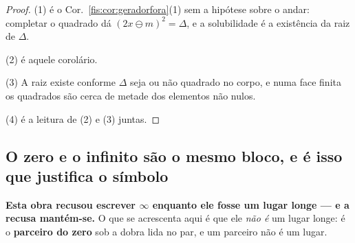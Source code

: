 \documentclass[livro.tex]{subfiles}
\begin{document}
\begin{proof}
(1) é o Cor.~\ref{fis:cor:geradorfora}(1) sem a hipótese sobre o andar: completar
o quadrado dá $(2x\ominus m)^{2}=\Delta$, e a solubilidade é a existência da raiz
de $\Delta$.

(2) é aquele corolário.

(3) A raiz existe conforme $\Delta$ seja ou não quadrado no corpo, e numa face
finita os quadrados são cerca de metade dos elementos não nulos.

(4) é a leitura de (2) e (3) juntas.
\end{proof}


\subsection*{O zero e o infinito são o mesmo bloco, e é isso que justifica o símbolo}

\noindent\textbf{Esta obra recusou escrever $\infty$ enquanto ele fosse um lugar
longe --- e a recusa mantém-se.} O que se acrescenta aqui é que ele \emph{não é}
um lugar longe: é o \textbf{parceiro do zero} sob a dobra lida no par, e um
parceiro não é um lugar.
\end{document}
